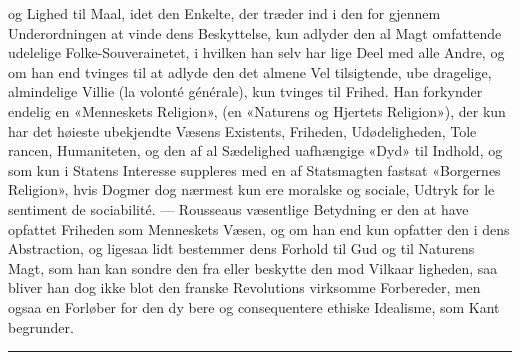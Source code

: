 \documentclass[12pt,a4paper]{book}
\newcommand{\divrule}{\begin{center}\rule{2cm}{0.4pt}\end{center}}
\begin{document}
og Lighed til Maal, idet den Enkelte, der træder ind i den
for gjennem Underordningen at vinde dens Beskyttelse, kun
adlyder den al Magt omfattende udelelige Folke-Souverainetet,
i hvilken han selv har lige Deel med alle Andre, og om han
end tvinges til at adlyde den det almene Vel tilsigtende, ube\-%
dragelige, almindelige Villie (la volonté générale), kun tvinges
til Frihed. Han forkynder endelig en «Menneskets Religion»,
(en «Naturens og Hjertets Religion»), der kun har det høieste
ubekjendte Væsens Existents, Friheden, Udødeligheden, Tole\-%
rancen, Humaniteten, og den af al Sædelighed uafhængige
«Dyd» til Indhold, og som kun i Statens Interesse suppleres
med en af Statsmagten fastsat «Borgernes Religion», hvis
Dogmer dog nærmest kun ere moralske og sociale, Udtryk for
le sentiment de sociabilité. --- Rousseaus væsentlige Betydning
er den at have opfattet Friheden som Menneskets Væsen, og
om han end kun opfatter den i dens Abstraction, og ligesaa\-%
lidt bestemmer dens Forhold til Gud og til Naturens Magt,
som han kan sondre den fra eller beskytte den mod Vilkaar\-%
ligheden, saa bliver han dog ikke blot den franske Revolutions
virksomme Forbereder, men ogsaa en Forløber for den dy\-%
bere og consequentere ethiske Idealisme, som Kant begrunder.

\divrule
\end{document}
